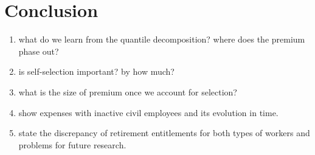 \documentclass{article}
\begin{document}
\section{Conclusion}
 \begin{enumerate}
     \item what do we learn from the quantile decomposition? where does the premium phase out?
     \item is self-selection important? by how much?
     \item what is the size of premium once we account for selection?
     \item show expenses with inactive civil employees and its evolution in time.
     \item state the discrepancy of retirement entitlements for both types of workers and problems for future research. 
\end{enumerate}  

\newpage
\scriptsize{}
\end{document}
